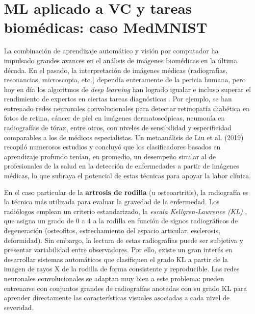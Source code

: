 \documentclass[11pt,spanish,listoffigures,listoftables]{tfgetsinf}
\begin{document}
\section{ML aplicado a VC y tareas biomédicas: caso MedMNIST}\label{sec:ml-medical} 
La combinación de aprendizaje automático y visión por computador ha impulsado grandes avances en el análisis de imágenes biomédicas 
en la última década. En el pasado, la interpretación de imágenes médicas (radiografías, resonancias, microscopia, etc.) dependía 
enteramente de la pericia humana, pero hoy en día los algoritmos de \textit{deep learning} han logrado igualar e incluso superar 
el rendimiento de expertos en ciertas tareas diagnósticas \cite{Liu2019}. Por ejemplo, se han entrenado redes neuronales convolucionales para 
detectar retinopatía diabética en fotos de retina, cáncer de piel en imágenes dermatoscópicas, neumonía en radiografías de tórax, 
entre otros, con niveles de sensibilidad y especificidad comparables a los de médicos especialistas. Un metaanálisis de Liu et al. 
(2019) recopiló numerosos estudios y concluyó que los clasificadores basados en aprendizaje profundo tenían, en promedio, un 
desempeño similar al de profesionales de la salud en la detección de enfermedades a partir de imágenes médicas, lo que subraya el 
potencial de estas técnicas para apoyar la labor clínica.

En el caso particular de la \textbf{artrosis de rodilla} (u osteoartritis), la radiografía es la técnica más utilizada para evaluar 
la gravedad de la enfermedad. Los radiólogos emplean un criterio estandarizado, la \textit{escala Kellgren-Lawrence (KL)} \cite{kellgren_lawrence_radiopaedia}, que asigna 
un grado de 0 a 4 a la rodilla en función de signos radiográficos de degeneración (osteofitos, estrechamiento del espacio articular, 
esclerosis, deformidad). Sin embargo, la lectura de estas radiografías puede ser subjetiva y presentar variabilidad entre observadores.
Por ello, existe un gran interés en desarrollar sistemas automáticos que clasifiquen el grado KL a partir de la imagen de rayos X de 
la rodilla de forma consistente y reproducible. Las redes neuronales convolucionales se adaptan muy bien a este problema: pueden 
entrenarse con conjuntos grandes de radiografías anotadas con su grado KL para aprender directamente las características visuales 
asociadas \cite{Rani2024} a cada nivel de severidad.
\end{document}
